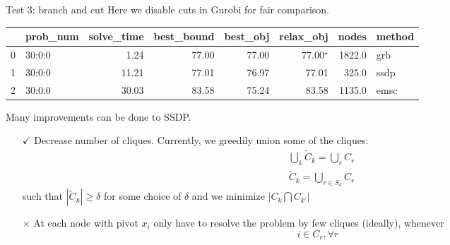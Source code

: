 \begin{frame}{Test 3: branch and cut}
  Here we disable cuts in Gurobi for fair comparison.
  \begin{tabular}{llrrrrrl}
    \toprule
    {} & prob\_num & solve\_time & best\_bound & best\_obj & relax\_obj      & nodes  & method \\
    \midrule
    0  & 30:0:0    & 1.24        & 77.00       & 77.00     & 77.00\(^\star\) & 1822.0 & grb    \\
    1  & 30:0:0    & 11.21       & 77.01       & 76.97     & 77.01           & 325.0  & ssdp   \\
    2  & 30:0:0    & 30.03       & 83.58       & 75.24     & 83.58           & 1135.0 & emsc   \\
    \bottomrule
  \end{tabular}

  Many improvements can be done to SSDP.
  \begin{itemize}
    \item[\(\checkmark\)] Decrease number of cliques. Currently, we greedily union some of the cliques:
          \[\begin{aligned}
               & \bigcup_k \tilde C_k = \bigcup_r C_r \\
               & \tilde C_k = \bigcup_{r\in S_k} C_r
            \end{aligned}  \]
          such that \(|\tilde C_k| \ge \delta \) for some choice of \(\delta\) and we minimize \(|C_k \bigcap C_{k'}|  \)
    \item[\(\times\)] At each node with pivot \(x_i\) only have to resolve the problem by few cliques (ideally), whenever
          \[i \in C_r, \forall r\]
  \end{itemize}
\end{frame}

\begin{frame}
  \scriptsize
  \printbibliography
\end{frame}

